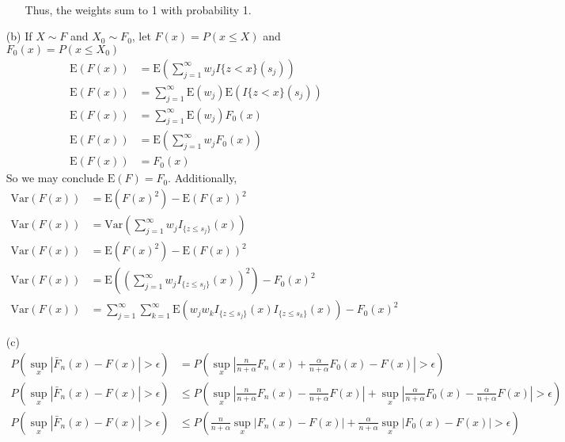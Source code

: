 \documentclass[11pt]{article}
\newcommand{\sumk}{\sum_{k=1}^\infty}
\newcommand{\sumj}{\sum_{j=1}^\infty}
\newcommand{\E}{\mathrm{E}}
\newcommand{\var}{\mathrm{Var}}
\theoremstyle{definition}
\begin{document}
\begin{itemize}
\begin{itemize}
\begin{align*}
                \end{align*}
                Thus, the weights sum to 1 with probability 1.
        \end{itemize}
            \item[(b)]
                If $X\sim F$ and $X_0\sim F_0$, let $F(x)=P(x\leq X)$ and $F_0(x)=P(x\leq X_0)$                
                    \begin{align*}
                        \E(F(x)) &= \E(\sum_{j=1}^\infty w_j I{\{z<x\}}(s_j)) \\
                        \E(F(x)) &= \sum_{j=1}^\infty \E(w_j)\E(I{\{z<x\}}(s_j)) \\
                        \E(F(x)) &= \sum_{j=1}^\infty \E(w_j)F_0(x) \\
                        \E(F(x)) &= \E(\sum_{j=1}^\infty w_jF_0(x)) \\
                        \E(F(x)) &= F_0(x) 
                    \end{align*}
                So we may conclude \(\E(F)=F_0\). Additionally, 
                    \begin{align*}
                        \var(F(x)) &= \E(F(x)^2) - \E(F(x))^2 \\
                        \var(F(x)) &= \var\left(\sumj w_jI_{\{z\leq s_j\}}(x)\right) \\
                        \var(F(x)) &= \E(F(x)^2) - \E(F(x))^2 \\
                        \var(F(x)) &= \E\left(\left(\sumj w_jI_{\{z\leq s_j\}}(x)\right)^2\right) - F_0(x)^2 \\
                        \var(F(x)) &= \sumj\sumk \E\left(w_jw_kI_{\{z\leq s_j\}}(x)I_{\{z\leq s_k\}}(x)\right) - F_0(x)^2 
                    \end{align*}
                \item[(c)]
                    \begin{align*}
                        P\left(\sup_x\left\vert \bar F_n(x)-F(x)\right\vert>\epsilon\right) &=P\left(\sup_x\left\vert \frac{n}{n+\alpha}F_n(x)+\frac{\alpha}{n+\alpha}F_0(x)-F(x)\right\vert>\epsilon\right) \\
                        P\left(\sup_x\left\vert \bar F_n(x)-F(x)\right\vert>\epsilon\right) &\leq P\left(\sup_x\left\vert \frac{n}{n+\alpha}F_n(x)-\frac{n}{n+\alpha}F(x)\right\vert + \sup_x\left\vert \frac{\alpha}{n+\alpha}F_0(x)-\frac{\alpha}{n+\alpha}F(x)\right\vert>\epsilon\right) \\
                        P\left(\sup_x\left\vert \bar F_n(x)-F(x)\right\vert>\epsilon\right) &\leq P\left(\frac{n}{n+\alpha}\sup_x\left\vert F_n(x)-F(x)\right\vert + \frac{\alpha}{n+\alpha}\sup_x\left\vert F_0(x)-F(x)\right\vert>\epsilon\right) \\

\end{align*}
\end{itemize}
\end{document}

